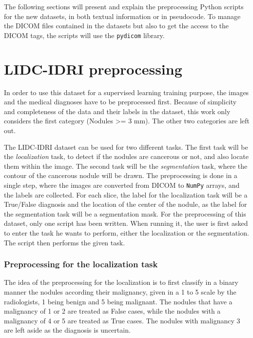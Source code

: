 The following sections will present and explain the preprocessing Python scripts for the new datasets, in both textual information or in pseudocode. To manage the DICOM files contained in the datasets but also to get the access to the DICOM tags, the scripts will use the \texttt{pydicom} library.

\section{LIDC-IDRI preprocessing}
\label{sec:lidcpreproc}
In order to use this dataset for a supervised learning training purpose, the images and the medical diagnoses have to be preprocessed first. Because of simplicity and completeness of the data and their labels in the dataset, this work only considers the first category (Nodules >= 3 mm). The other two categories are left out.

The LIDC-IDRI dataset can be used for two different tasks. The first task will be the \emph{localization} task, to detect if the nodules are cancerous or not, and also locate them within the image. The second task will be the \emph{segmentation} task, where the contour of the cancerous nodule will be drawn. The preprocessing is done in a single step, where the images are converted from DICOM to \texttt{NumPy} arrays, and the labels are collected. For each slice, the label for the localization task will be a True/False diagnosis and the location of the center of the nodule, as the label for the segmentation task will be a segmentation mask. For the preprocessing of this dataset, only one script has been written. When running it, the user is first asked to enter the task he wants to perform, either the localization or the segmentation. The script then performs the given task.

\subsubsection{Preprocessing for the localization task}
The idea of the preprocessing for the localization is to first classify in a binary manner the nodules according their malignancy, given in a 1 to 5 scale by the radiologists, 1 being benign and 5 being malignant. The nodules that have a malignancy of 1 or 2 are treated as False cases, while the nodules with a malignancy of 4 or 5 are treated as True cases. The nodules with malignancy 3 are left aside as the diagnosis is uncertain.

